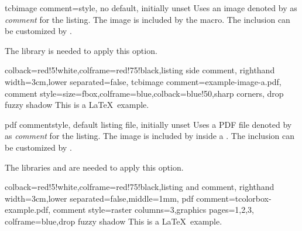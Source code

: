 

\clearpage
\begin{docTcbKey}[][doc new=2014-11-14]{tcbimage comment}{=}{style, no default, initially unset}
  Uses an image denoted by  as \textit{comment} for the listing.
  The image is included by the  macro.
  The inclusion can be customized by .
  \begin{marker}
  The library  is needed to apply this option.
  \end{marker}
  \medskip
\begin{dispExample}
\begin{tcblisting}{colback=red!5!white,colframe=red!75!black,listing side comment,
  righthand width=3cm,lower separated=false,
  tcbimage comment={example-image-a.pdf},
  comment style={size=fbox,colframe=blue,colback=blue!50,sharp corners,
    drop fuzzy shadow}}
This is a \LaTeX\ example.
\end{tcblisting}
\end{dispExample}
\end{docTcbKey}

\clearpage

\begin{docTcbKey}[][doc new=2014-11-14]{pdf comment}{}{style, default listing file, initially unset}
  Uses a PDF file denoted by  as \textit{comment} for the listing.
  The image is included by  inside a .
  The inclusion can be customized by .
  \begin{marker}
  The libraries  and  are needed to apply this option.
  \end{marker}
  \medskip
\begin{dispExample}
\begin{tcblisting}{colback=red!5!white,colframe=red!75!black,listing and comment,
  righthand width=3cm,lower separated=false,middle=1mm,
  pdf comment={tcolorbox-example.pdf},
  comment style={raster columns=3,graphics pages={1,2,3},
    colframe=blue,drop fuzzy shadow}}
This is a \LaTeX\ example.
\end{tcblisting}
\end{dispExample}
\end{docTcbKey}

